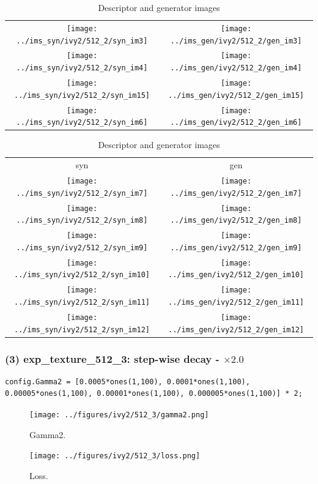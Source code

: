 \documentclass[letter]{article}
\begin{document}
\begin{table}[h!]
\begin{tabular}{cc}
		\texttt{[image: ../ims\_syn/ivy2/512\_2/syn\_im3]} & \texttt{[image: ../ims\_gen/ivy2/512\_2/gen\_im3]} \tabularnewline
		\texttt{[image: ../ims\_syn/ivy2/512\_2/syn\_im4]} & \texttt{[image: ../ims\_gen/ivy2/512\_2/gen\_im4]} \tabularnewline
		\texttt{[image: ../ims\_syn/ivy2/512\_2/syn\_im15]} & \texttt{[image: ../ims\_gen/ivy2/512\_2/gen\_im15]} \tabularnewline
		\texttt{[image: ../ims\_syn/ivy2/512\_2/syn\_im6]} & \texttt{[image: ../ims\_gen/ivy2/512\_2/gen\_im6]} \tabularnewline
	\end{tabular}
	\begin{tabular}{cc}
		syn & gen\tabularnewline
		\texttt{[image: ../ims\_syn/ivy2/512\_2/syn\_im7]} & \texttt{[image: ../ims\_gen/ivy2/512\_2/gen\_im7]} \tabularnewline
		\texttt{[image: ../ims\_syn/ivy2/512\_2/syn\_im8]} & \texttt{[image: ../ims\_gen/ivy2/512\_2/gen\_im8]} \tabularnewline
		\texttt{[image: ../ims\_syn/ivy2/512\_2/syn\_im9]} & \texttt{[image: ../ims\_gen/ivy2/512\_2/gen\_im9]} \tabularnewline
		\texttt{[image: ../ims\_syn/ivy2/512\_2/syn\_im10]} & \texttt{[image: ../ims\_gen/ivy2/512\_2/gen\_im10]} \tabularnewline
		\texttt{[image: ../ims\_syn/ivy2/512\_2/syn\_im11]} & \texttt{[image: ../ims\_gen/ivy2/512\_2/gen\_im11]} \tabularnewline
		\texttt{[image: ../ims\_syn/ivy2/512\_2/syn\_im12]} & \texttt{[image: ../ims\_gen/ivy2/512\_2/gen\_im12]} \tabularnewline
	\end{tabular}
	\caption{Descriptor and generator images}
\end{table}

\newpage

\subsubsection*{(3) exp\_texture\_512\_3: step-wise decay - $\times2.0$}

\begin{lstlisting}
config.Gamma2 = [0.0005*ones(1,100), 0.0001*ones(1,100), 0.00005*ones(1,100), 0.00001*ones(1,100), 0.000005*ones(1,100)] * 2;
\end{lstlisting}

\begin{figure}[h!]
	\centering
	\texttt{[image: ../figures/ivy2/512\_3/gamma2.png]}
	\caption{\label{fig:gamma1}Gamma2.}
\end{figure}

\begin{figure}[h!]
	\centering
	\texttt{[image: ../figures/ivy2/512\_3/loss.png]}
	\caption{\label{fig:gamma1}Loss.}
\end{figure}
\end{document}
